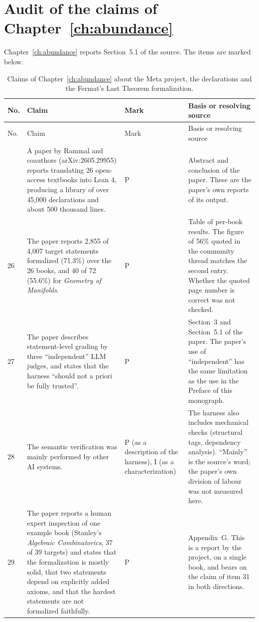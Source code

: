 \section{Audit of the claims of Chapter~\ref{ch:abundance}}

Chapter~\ref{ch:abundance} reports Section~5.1 of the source. The items are marked below.

\begin{longtable}{@{}p{}p{}p{}p{}@{}}
\caption{Claims of Chapter~\ref{ch:abundance} about the Meta project, the declarations and the Fermat's Last Theorem formalization.\label{tab:abundaudit}}\\
\toprule
No. & Claim & Mark & Basis or resolving source \\
\midrule
\endfirsthead
\toprule
No. & Claim & Mark & Basis or resolving source \\
\midrule
\endhead
\bottomrule
\endfoot
25 & A paper by Rammal and coauthors (arXiv:2605.29955) reports translating 26 open-access textbooks into Lean 4, producing a library of over 45,000 declarations and about 500 thousand lines. & P & Abstract and conclusion of the paper. These are the paper's own reports of its output. \\
26 & The paper reports 2,855 of 4,007 target statements formalized (71.3\%) over the 26 books, and 40 of 72 (55.6\%) for \emph{Geometry of Manifolds}. & P & Table of per-book results. The figure of 56\% quoted in the community thread matches the second entry. Whether the quoted page number is correct was not checked. \\
27 & The paper describes statement-level grading by three ``independent'' LLM judges, and states that the harness ``should not a priori be fully trusted''. & P & Section~3 and Section~5.1 of the paper. The paper's use of ``independent'' has the same limitation as the use in the Preface of this monograph. \\
28 & The semantic verification was mainly performed by other AI systems. & P (as a description of the harness), I (as a characterization) & The harness also includes mechanical checks (structural tags, dependency analysis). ``Mainly'' is the source's word; the paper's own division of labour was not measured here. \\
29 & The paper reports a human expert inspection of one example book (Stanley's \emph{Algebraic Combinatorics}, 37 of 39 targets) and states that the formalization is mostly solid, that two statements depend on explicitly added axioms, and that the hardest statements are not formalized faithfully. & P & Appendix~G. This is a report by the project, on a single book, and bears on the claim of item 31 in both directions. \\

\end{longtable}
